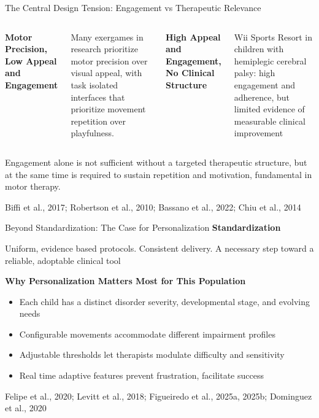\documentclass[aspectratio=169, 12pt]{beamer}
\newcommand{\citefooter}[1]{\hfill{\tiny #1}}
\begin{document}
\begin{frame}{The Central Design Tension: Engagement vs Therapeutic Relevance}
	
	
	\begin{columns}[t]
		\textbf{\textcolor{gbAqua}{Motor Precision, Low Appeal and Engagement}}
		
		Many exergames in research prioritize motor precision over visual appeal, with task isolated interfaces that prioritize movement repetition over playfulness.
		
		\textbf{\textcolor{gbAqua}{High Appeal and Engagement, No Clinical Structure}}
		
		Wii Sports Resort in children with hemiplegic cerebral palsy: high engagement and adherence, but limited evidence of measurable clinical improvement
	\end{columns}
	
	\vspace{0.3cm}
	
	\alert{Engagement alone is not sufficient without a targeted therapeutic structure, but at the same time is required to sustain repetition and motivation, fundamental in motor therapy.}
	
	\citefooter{Biffi et al., 2017; Robertson et al., 2010; Bassano et al., 2022; Chiu et al., 2014}
\end{frame}

\begin{frame}{Beyond Standardization: The Case for Personalization}
	\textbf{\textcolor{gbAqua}{Standardization}}
	
	Uniform, evidence based protocols. Consistent delivery. A necessary step toward a reliable, adoptable clinical tool
	
	\vspace{0.3cm}
	
	\textbf{\textcolor{gbAqua}{Why Personalization Matters Most for This Population}}
	
	\begin{itemize}
		\item Each child has a distinct disorder severity, developmental stage, and evolving needs
		\item Configurable movements accommodate different impairment profiles
		\item Adjustable thresholds let therapists modulate difficulty and sensitivity
		\item Real time adaptive features prevent frustration, facilitate success
	\end{itemize}
	
	\citefooter{Felipe et al., 2020; Levitt et al., 2018; Figueiredo et al., 2025a, 2025b; Dominguez et al., 2020}
\end{frame}
\end{document}
